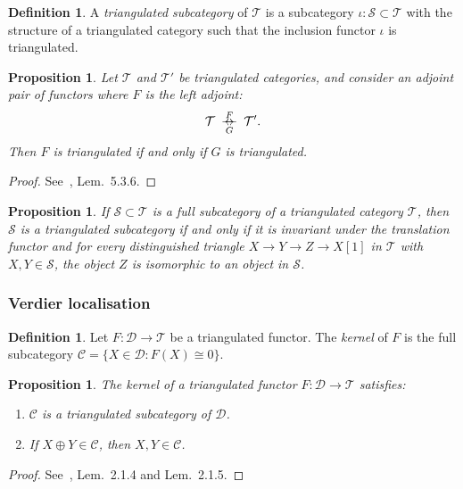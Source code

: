 \documentclass[12pt,a4paper]{article}
\providecommand{\rightleftarrows}{%
  \mathrel{\rightarrow\mkern-14mu\leftarrow}}
\newtheorem{proposition}[theorem]{Proposition}
\theoremstyle{definition}
\newtheorem{definition}[theorem]{Definition}
\begin{document}
\begin{definition}\label{def:triangulated-subcategory}
A \emph{triangulated subcategory} of $\mathcal{T}$ is a subcategory
$\iota:\mathcal{S}\subset\mathcal{T}$ with the structure of a triangulated category
such that the inclusion functor $\iota$ is triangulated.
\end{definition}

\begin{proposition}\label{prop:adjoint-triangulated}
Let $\mathcal{T}$ and $\mathcal{T}'$ be triangulated categories, and consider an
adjoint pair of functors where $F$ is the left adjoint:
\[
\mathcal{T}\;\overset{F}{\underset{G}{\rightleftarrows}}\;\mathcal{T}'.
\]
Then $F$ is triangulated if and only if $G$ is triangulated.
\end{proposition}
\begin{proof}
See~\cite{Nee01}, Lem.\ 5.3.6.
\end{proof}

\begin{proposition}\label{prop:full-subcategory}
If $\mathcal{S}\subset\mathcal{T}$ is a full subcategory of a triangulated category
$\mathcal{T}$, then $\mathcal{S}$ is a triangulated subcategory if and only if it is
invariant under the translation functor and for every distinguished triangle
$X\to Y\to Z\to X[1]$ in $\mathcal{T}$ with $X,Y\in\mathcal{S}$, the object $Z$ is
isomorphic to an object in $\mathcal{S}$.
\end{proposition}

\subsubsection{Verdier localisation}

\begin{definition}\label{def:kernel}
Let $F:\mathcal{D}\to\mathcal{T}$ be a triangulated functor.  The \emph{kernel} of
$F$ is the full subcategory $\mathcal{C}=\{X\in\mathcal{D}: F(X)\cong 0\}$.
\end{definition}

\begin{proposition}\label{prop:kernel-properties}
The kernel of a triangulated functor $F:\mathcal{D}\to\mathcal{T}$ satisfies:
\begin{enumerate}
  \item $\mathcal{C}$ is a triangulated subcategory of $\mathcal{D}$.
  \item If $X\oplus Y\in\mathcal{C}$, then $X,Y\in\mathcal{C}$.
\end{enumerate}
\end{proposition}
\begin{proof}
See~\cite{Nee01}, Lem.\ 2.1.4 and Lem.\ 2.1.5.
\end{proof}
\end{document}
